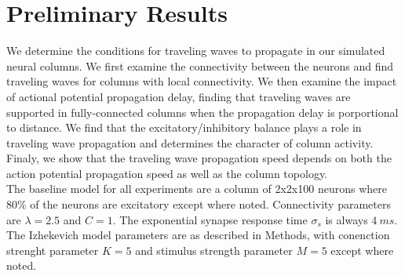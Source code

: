 \documentclass[a4paper,11pt]{article}
\begin{document}
\section{Preliminary Results}
We determine the conditions for traveling waves to propagate in our simulated neural columns.
We first examine the connectivity between the neurons and find traveling waves for columns with local connectivity.
We then examine the impact of actional potential propagation delay, finding that traveling waves are supported in fully-connected columns when the propagation delay is porportional to distance.
We find that the excitatory/inhibitory balance plays a role in traveling wave propagation and determines the character of column activity.
Finaly, we show that the traveling wave propagation speed depends on both the action potential propagation speed as well as the column topology. \\
The baseline model for all experiments are a column of 2x2x100 neurons where $80\%$ of the neurons are excitatory except where noted.
Connectivity parameters are $\lambda=2.5$ and $C=1$.
The exponential synapse response time $\sigma_s$ is always $4~ms$.
The Izhekevich model parameters are as described in Methods, with conenction strenght parameter $K=5$ and stimulus strength parameter $M=5$ except where noted.
\end{document}
